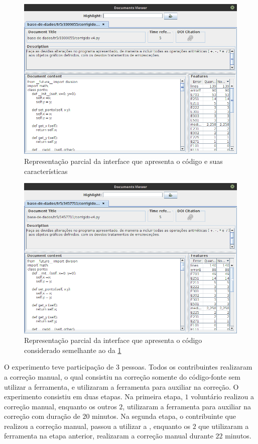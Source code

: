 		\begin{figure}[h]
			\centering
			\includegraphics[width=0.8\linewidth]{imagem/codigo1}
			\caption[Representação parcial da interface que apresenta o código e suas características]
			{Representação parcial da interface que apresenta o código e suas características \cite{Alencar-etal:2012}}
			\label{fig:codigo1}
		\end{figure}
		
		\begin{figure}[H]
			\centering
			\includegraphics[width=0.8\linewidth]{imagem/codigo2}
			\caption[Representação parcial da interface que apresenta o código considerado semelhante ao da \cref{fig:codigo1}]
			{Representação parcial da interface que apresenta o código considerado semelhante ao da \cref{fig:codigo1} \cite{Alencar-etal:2012}}
			\label{fig:codigo2}
		\end{figure}
		
		O experimento teve participação de $3$ pessoas. Todos os contribuintes realizaram
		a correção manual, o qual consistiu na correção somente do código-fonte sem
		utilizar a ferramenta, e utilizaram a ferramenta 
		para auxiliar na correção. O experimento consistiu em duas etapas. Na primeira
		etapa, $1$ voluntário realizou a correção manual, enquanto os outros $2$,
		utilizaram a ferramenta para auxiliar na correção com duração de $20$ minutos.
		Na segunda etapa, o contribuinte que realizou a correção manual, passou a
		utilizar a , enquanto os $2$ que utilizaram a ferramenta
		na etapa anterior, realizaram a correção manual durante $22$ minutos.
		
